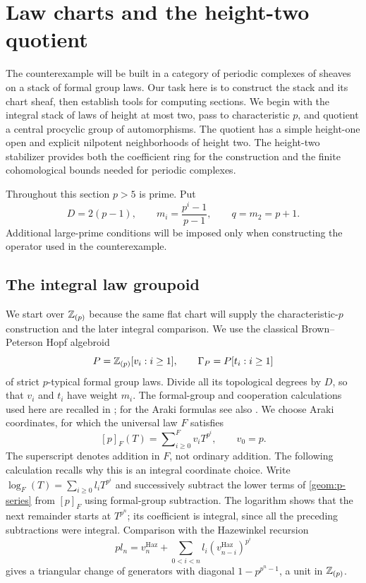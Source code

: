 \section{Law charts and the height-two quotient}
\label{geom:section}

The counterexample will be built in a category of periodic complexes
of sheaves on a stack of formal group laws.  Our task here is to
construct the stack and its chart sheaf, then establish tools for
computing sections.  We begin with the integral stack of laws of height
at most two, pass to characteristic $p$, and quotient a central
procyclic group of automorphisms.  The quotient has a simple height-one
open and explicit nilpotent neighborhoods of height two.  The height-two
stabilizer provides both the coefficient ring for the construction and
the finite cohomological bounds needed for periodic complexes.

Throughout this section $p>5$ is prime.  Put
\[
 D=2(p-1),\qquad m_i=\frac{p^i-1}{p-1},\qquad q=m_2=p+1.
\]
Additional large-prime conditions will be imposed only when constructing
the operator used in the counterexample.

\subsection{The integral law groupoid}

We start over $\mathbb Z_{(p)}$ because the same flat chart will supply the
characteristic-$p$ construction and the later integral comparison.
We use the classical Brown--Peterson Hopf algebroid
\[
 P=\mathbb Z_{(p)}[v_i:i\geq1],\qquad
 \Gamma_P=P[t_i:i\geq1]
\]
of strict $p$-typical formal group laws.  Divide all its topological
degrees by $D$, so that $v_i$ and $t_i$ have weight $m_i$.
The formal-group and cooperation calculations used here are recalled
in \cite[Chapter~4]{Ravenel1986}; for the Araki formulas see also
\cite[Appendix~B.5.5--B.5.6, B.5.12, and B.5.15]{Ravenel1992}.
We choose Araki coordinates, for which
the universal law $F$ satisfies
\begin{equation}\label{geom:p-series}
 [p]_F(T)=\mathop{\textstyle\sum}\nolimits_{i\geq0}^{F}
             v_iT^{p^i},\qquad v_0=p.
\end{equation}
The superscript denotes addition in $F$, not ordinary addition.
The following calculation recalls why this is an integral coordinate
choice.  Write $\log_F(T)=\sum_{i\geq0}l_iT^{p^i}$ and successively
subtract the lower terms of \eqref{geom:p-series} from $[p]_F$ using
formal-group subtraction.  The logarithm shows that the next remainder starts at
$T^{p^n}$; its coefficient is integral, since all the preceding
subtractions were integral.  Comparison with the Hazewinkel recursion
\[
 p l_n=v_n^{\mathrm{Haz}}
       +\sum_{0<i<n}l_i(v_{n-i}^{\mathrm{Haz}})^{p^i}
\]
gives a triangular change of generators with diagonal
$1-p^{p^n-1}$, a unit in $\mathbb Z_{(p)}$.

